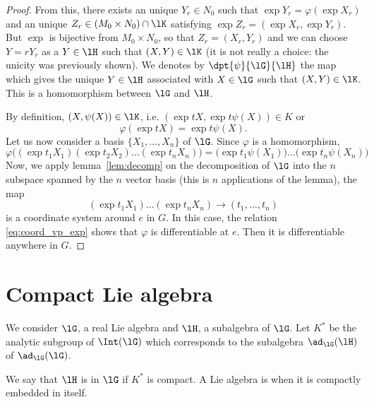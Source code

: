 \begin{proof}
From this, there exists an unique $Y_r\in N_0$ such that $\exp Y_r=\varphi(\exp X_r)$ and an unique $Z_r\in(M_0\times N_0)\cap\lK$ satisfying  $\exp Z_r=(\exp X_r,\exp Y_r)$. But $\exp$ is bijective from $M_0\times N_0$, so that $Z_r=(X_r,Y_r)$ and we can choose $Y=rY_r$ as a $Y\in\lH$ such that $(X,Y)\in\lK$ (it is not really a choice: the unicity was previously shown). We denotes by $\dpt{\psi}{\lG}{\lH}$ the map which gives the unique $Y\in\lH$ associated with $X\in\lG$ such that $(X,Y)\in\lK$. This is a homomorphism between $\lG$ and $\lH$.

By definition, $(X,\psi(X))\in\lK$, i.e. $(\exp tX,\exp t\psi(X))\in K$ or
\begin{equation}
  \varphi(\exp tX)=\exp t\psi(X).
\end{equation}
Let us now consider a basis $\{X_1,\ldots,X_n\}$ of $\lG$. Since $\varphi$ is a homomorphism,
\begin{equation}\label{eq:coord_vp_exp}
   \varphi\big((\exp t_1X_1)(\exp t_2X_2)\ldots(\exp t_nX_n)\big)
     =\big(\exp t_1\psi(X_1)\big)\ldots\big( \exp t_n\psi(X_n) \big)
\end{equation}
Now, we apply lemma~\ref{lem:decomp} on the decomposition of $\lG$ into the $n$ subspace spanned by the $n$ vector basis (this is $n$ applications of the lemma), the map
\[
  (\exp t_1X_1)\ldots(\exp t_nX_n)\to (t_1,\ldots,t_n)
\]
is a coordinate system around $e$ in $G$. In this case, the relation \eqref{eq:coord_vp_exp} shows that $\varphi$ is differentiable at $e$. Then it is differentiable anywhere in $G$.
\end{proof}
\section{Compact Lie algebra}
\label{pg:compact_Lie}



We consider $\lG$, a real Lie algebra and $\lH$, a subalgebra of $\lG$. Let $K^*$ be the analytic subgroup of $\Int(\lG)$ which corresponds to the subalgebra $\ad_{\lG}(\lH)$ of $\ad_{\lG}(\lG)$.

\begin{definition}      \label{DEFooROMGooTLicyL}
We say that $\lH$ is  in $\lG$ if $K^*$ is compact. A Lie algebra is  when it is compactly embedded in itself.
\end{definition}

